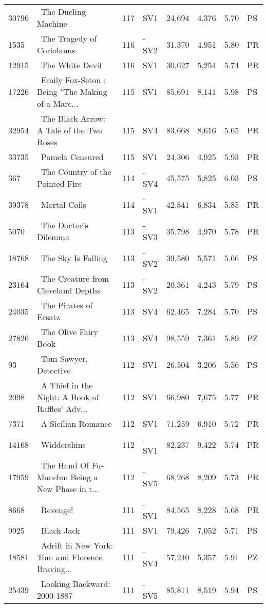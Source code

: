 \begin{longtable}{l | l | l | l | l | l | l | l}
30796 & ~The Dueling Machine & 117 & SV1 & 24,694 & 4,376 & 5.70 & PS\\
1535 & ~The Tragedy of Coriolanus & 116 & -SV2 & 31,370 & 4,951 & 5.80 & PR\\
12915 & ~The White Devil & 116 & SV1 & 30,627 & 5,254 & 5.74 & PR\\
17226 & ~Emily Fox-Seton
: Being "The Making of a Marc... & 115 & SV1 & 85,691 & 8,141 & 5.98 & PS\\
32954 & ~The Black Arrow: A Tale of the Two Roses & 115 & SV4 & 83,668 & 8,616 & 5.65 & PR\\
33735 & ~Pamela Censured & 115 & SV1 & 24,306 & 4,925 & 5.93 & PR\\
367 & ~The Country of the Pointed Firs & 114 & -SV4 & 45,575 & 5,825 & 6.03 & PS\\
39378 & ~Mortal Coils & 114 & -SV1 & 42,841 & 6,834 & 5.85 & PR\\
5070 & ~The Doctor's Dilemma & 113 & -SV3 & 35,798 & 4,970 & 5.78 & PR\\
18768 & ~The Sky Is Falling & 113 & -SV2 & 39,580 & 5,571 & 5.66 & PS\\
23164 & ~The Creature from Cleveland Depths & 113 & -SV2 & 20,361 & 4,243 & 5.79 & PS\\
24035 & ~The Pirates of Ersatz & 113 & SV4 & 62,465 & 7,284 & 5.70 & PS\\
27826 & ~The Olive Fairy Book & 113 & SV4 & 98,559 & 7,361 & 5.89 & PZ\\
93 & ~Tom Sawyer, Detective & 112 & SV1 & 26,504 & 3,206 & 5.56 & PS\\
2098 & ~A Thief in the Night: A Book of Raffles' Adv... & 112 & SV1 & 66,980 & 7,675 & 5.77 & PR\\
7371 & ~A Sicilian Romance & 112 & SV1 & 71,259 & 6,910 & 5.72 & PR\\
14168 & ~Widdershins & 112 & -SV1 & 82,237 & 9,422 & 5.74 & PR\\
17959 & ~The Hand Of Fu-Manchu: Being a New Phase in t... & 112 & -SV5 & 68,268 & 8,209 & 5.73 & PR\\
8668 & ~Revenge! & 111 & -SV1 & 84,565 & 8,228 & 5.68 & PR\\
9925 & ~Black Jack & 111 & SV1 & 79,426 & 7,052 & 5.71 & PS\\
18581 & ~Adrift in New York: Tom and Florence Braving... & 111 & -SV4 & 57,240 & 5,357 & 5.91 & PZ\\
25439 & ~Looking Backward: 2000-1887 & 111 & -SV5 & 85,811 & 8,519 & 5.94 & PS\\

\end{longtable}
